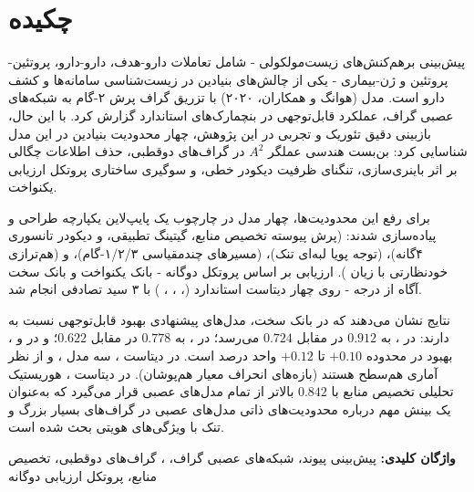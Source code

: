 \chapter*{چکیده}

پیش‌بینی برهم‌کنش‌های زیست‌مولکولی  -  شامل تعاملات دارو-هدف، دارو-دارو، پروتئین-پروتئین و ژن-بیماری  -  یکی از چالش‌های بنیادین در زیست‌شناسی سامانه‌ها و کشف دارو است. مدل  (هوانگ و همکاران، ۲۰۲۰) با تزریق گراف پرش ۲-گام به شبکه‌های عصبی گراف، عملکرد قابل‌توجهی در بنچمارک‌های استاندارد گزارش کرد. با این حال، بازبینی دقیق تئوریک و تجربی در این پژوهش، چهار محدودیت بنیادین در این مدل شناسایی کرد: بن‌بست هندسی عملگر $A^2$ در گراف‌های دوقطبی، حذف اطلاعات چگالی بر اثر باینری‌سازی، تنگنای ظرفیت دیکودر خطی، و سوگیری ساختاری پروتکل ارزیابی یکنواخت.

برای رفع این محدودیت‌ها، چهار مدل در چارچوب یک پایپ‌لاین یکپارچه طراحی و پیاده‌سازی شدند:  (پرش پیوسته تخصیص منابع، گیتینگ تطبیقی، و دیکودر تانسوری ۴‌گانه)،  (توجه پویا لبه‌ای تنک)،  (مسیرهای چندمقیاسی ۱/۲/۳-گام)، و  (هم‌ترازی خودنظارتی با زیان ). ارزیابی بر اساس پروتکل دوگانه  -  بانک یکنواخت و بانک سخت آگاه از درجه  -  روی چهار دیتاست استاندارد (، ، ، ) با ۳ سید تصادفی انجام شد.

نتایج نشان می‌دهند که در بانک سخت، مدل‌های پیشنهادی بهبود قابل‌توجهی نسبت به  دارند: در ،  به $0.912$ در مقابل $0.724$ می‌رسد؛ در ،  به $0.778$ در مقابل $0.622$؛ و در  و ، بهبود در محدوده $+0.10$ تا $+0.12$ واحد درصد است. در دیتاست ، سه مدل ،  و  از نظر آماری هم‌سطح هستند (بازه‌های انحراف معیار هم‌پوشان). در دیتاست ، هوریستیک تحلیلی تخصیص منابع با $0.842$ بالاتر از تمام مدل‌های عصبی قرار می‌گیرد که به‌عنوان یک بینش مهم درباره محدودیت‌های ذاتی مدل‌های عصبی در گراف‌های بسیار بزرگ و تنک با ویژگی‌های هویتی بحث شده است.

\vspace{1em}
\noindent\textbf{واژگان کلیدی:} پیش‌بینی پیوند، شبکه‌های عصبی گراف، ، گراف‌های دوقطبی، تخصیص منابع، پروتکل ارزیابی دوگانه
